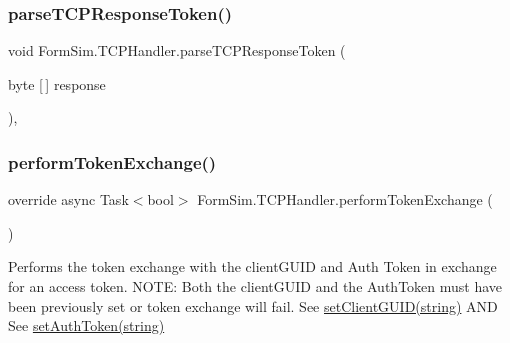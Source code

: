\mbox{\label{class_form_sim_1_1_t_c_p_handler_a25c22dcc9e98e6d182d62dd47a1cf7e0}} 
\subsubsection{\texorpdfstring{parse\+T\+C\+P\+Response\+Token()}{parseTCPResponseToken()}}
{\footnotesize\ttfamily void Form\+Sim.\+T\+C\+P\+Handler.\+parse\+T\+C\+P\+Response\+Token (\begin{DoxyParamCaption}\item[{byte \mbox{[}$\,$\mbox{]}}]{response }\end{DoxyParamCaption})\hspace{0.3cm}{\ttfamily [inline]}, {\ttfamily [private]}}

\mbox{\label{class_form_sim_1_1_t_c_p_handler_a61075c8a24b97ae7c86d357d6ee5a49e}} 
\subsubsection{\texorpdfstring{perform\+Token\+Exchange()}{performTokenExchange()}}
{\footnotesize\ttfamily override async Task$<$bool$>$ Form\+Sim.\+T\+C\+P\+Handler.\+perform\+Token\+Exchange (\begin{DoxyParamCaption}{ }\end{DoxyParamCaption})\hspace{0.3cm}{\ttfamily [inline]}}



Performs the token exchange with the client\+G\+U\+ID and Auth Token in exchange for an access token. N\+O\+TE\+: Both the client\+G\+U\+ID and the Auth\+Token must have been previously set or token exchange will fail. See \mbox{\hyperlink{interface_form_sim_1_1_f_r_c___handler_a3c77b2e99c98553928e463a9cbb5f7d4}{set\+Client\+G\+U\+I\+D(string)}} A\+ND See \mbox{\hyperlink{interface_form_sim_1_1_f_r_c___handler_a1314ea0937067435e3326818baa9d0c1}{set\+Auth\+Token(string)}} 

